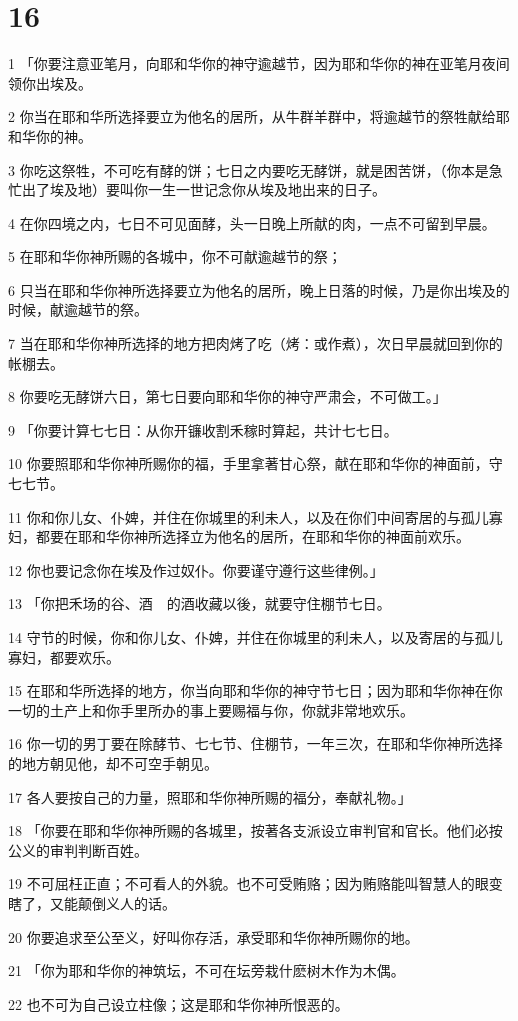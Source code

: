 \chapter{16}

\par 1 「你要注意亚笔月，向耶和华你的神守逾越节，因为耶和华你的神在亚笔月夜间领你出埃及。
\par 2 你当在耶和华所选择要立为他名的居所，从牛群羊群中，将逾越节的祭牲献给耶和华你的神。
\par 3 你吃这祭牲，不可吃有酵的饼；七日之内要吃无酵饼，就是困苦饼，（你本是急忙出了埃及地）要叫你一生一世记念你从埃及地出来的日子。
\par 4 在你四境之内，七日不可见面酵，头一日晚上所献的肉，一点不可留到早晨。
\par 5 在耶和华你神所赐的各城中，你不可献逾越节的祭；
\par 6 只当在耶和华你神所选择要立为他名的居所，晚上日落的时候，乃是你出埃及的时候，献逾越节的祭。
\par 7 当在耶和华你神所选择的地方把肉烤了吃（烤：或作煮），次日早晨就回到你的帐棚去。
\par 8 你要吃无酵饼六日，第七日要向耶和华你的神守严肃会，不可做工。」
\par 9 「你要计算七七日：从你开镰收割禾稼时算起，共计七七日。
\par 10 你要照耶和华你神所赐你的福，手里拿著甘心祭，献在耶和华你的神面前，守七七节。
\par 11 你和你儿女、仆婢，并住在你城里的利未人，以及在你们中间寄居的与孤儿寡妇，都要在耶和华你神所选择立为他名的居所，在耶和华你的神面前欢乐。
\par 12 你也要记念你在埃及作过奴仆。你要谨守遵行这些律例。」
\par 13 「你把禾场的谷、酒　的酒收藏以後，就要守住棚节七日。
\par 14 守节的时候，你和你儿女、仆婢，并住在你城里的利未人，以及寄居的与孤儿寡妇，都要欢乐。
\par 15 在耶和华所选择的地方，你当向耶和华你的神守节七日；因为耶和华你神在你一切的土产上和你手里所办的事上要赐福与你，你就非常地欢乐。
\par 16 你一切的男丁要在除酵节、七七节、住棚节，一年三次，在耶和华你神所选择的地方朝见他，却不可空手朝见。
\par 17 各人要按自己的力量，照耶和华你神所赐的福分，奉献礼物。」
\par 18 「你要在耶和华你神所赐的各城里，按著各支派设立审判官和官长。他们必按公义的审判判断百姓。
\par 19 不可屈枉正直；不可看人的外貌。也不可受贿赂；因为贿赂能叫智慧人的眼变瞎了，又能颠倒义人的话。
\par 20 你要追求至公至义，好叫你存活，承受耶和华你神所赐你的地。
\par 21 「你为耶和华你的神筑坛，不可在坛旁栽什麽树木作为木偶。
\par 22 也不可为自己设立柱像；这是耶和华你神所恨恶的。

